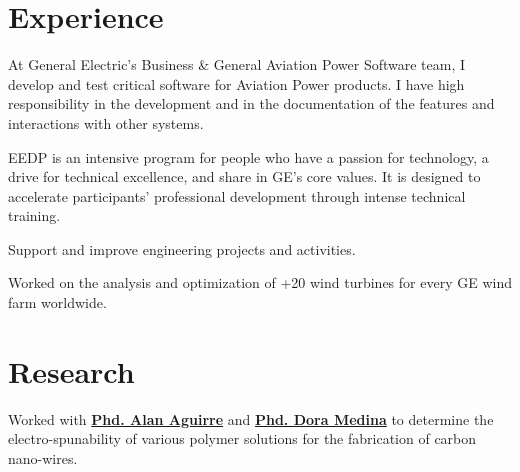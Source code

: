 \documentclass[]{deedy-resume-openfont}
\begin{document}
\hfill
\begin{minipage}[t]{0.65\textwidth} 


\section{Experience}
\vspace{\topsep} %
\begin{tightemize}
\item At General Electric's Business \& General Aviation Power Software team, I develop and test critical software for Aviation Power products. I have high responsibility in the development and in the documentation of the features and interactions with other systems.
\end{tightemize}
\sectionsep

\begin{tightemize}
\item EEDP is an intensive program for people who have a passion for technology, a drive for technical excellence, and share in GE's core values. It is designed to accelerate participants' professional development through intense technical training.
\end{tightemize}
\sectionsep

\begin{tightemize}
\item Support and improve engineering projects and activities.
\item Worked on the analysis and optimization of +20 wind turbines for every GE wind farm worldwide.
\end{tightemize}
\sectionsep


\section{Research}
Worked with \textbf{\href{https://orcid.org/0000-0003-0455-5401}{Phd. Alan Aguirre}} and \textbf{\href{https://orcid.org/0000-0001-5325-0079}{Phd. Dora Medina}} to determine the electro-spunability of various polymer solutions for the fabrication of carbon nano-wires.
\sectionsep


\end{minipage}
\end{document}
